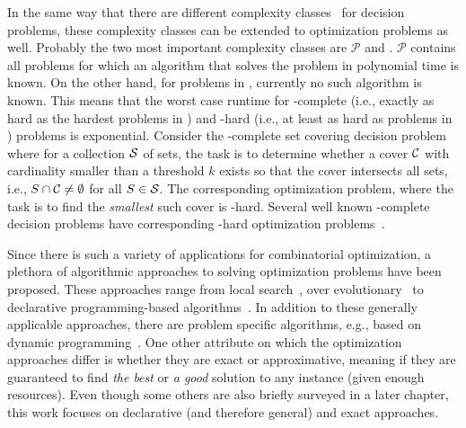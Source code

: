 In the same way that there are different complexity classes~\autocite{AroraBarak2009-complexity} for decision problems, these complexity classes can be extended to optimization problems as well.
Probably the two most important complexity classes are $\mathcal{P}$ and \NP.
$\mathcal{P}$ contains all problems for which an algorithm that solves the problem in polynomial time is known.
On the other hand, for problems in \NP, currently no such algorithm is known.
This means that the worst case runtime for \NP-complete (i.e., exactly as hard as the hardest problems in \NP) and \NP-hard (i.e., at least as hard as problems in \NP) problems is exponential.
Consider the \NP-complete set covering decision problem~\autocite{DBLP:conf/coco/Karp72} where for a collection $\mathcal{S}$ of sets, the task is to determine whether a cover $\mathcal{C}$ with cardinality smaller than a threshold $k$ exists so that the cover intersects all sets, i.e., $S \cap \mathcal{C} \neq \emptyset$ for all $S\in\mathcal{S}$.
The corresponding optimization problem, where the task is to find the \emph{smallest} such cover is \NP-hard.
Several well known \NP-complete decision problems have corresponding \NP-hard optimization problems~\autocite{KorteVygen2018-15}.

Since there is such a variety of applications for combinatorial optimization, a plethora of algorithmic approaches to solving optimization problems have been proposed.
These approaches range from local search~\autocite{DBLP:books/daglib/0017492}, over evolutionary~\autocites{DBLP:books/daglib/0087893,DBLP:journals/jgo/StornP97} to declarative programming-based algorithms~\autocite{handbook2-maxsat,ChenEtAl2010-intro,DBLP:reference/fai/2}.
In addition to these generally applicable approaches, there are problem specific algorithms, e.g., based on dynamic programming~\autocite{DBLP:conf/aaai/DemirovicS21}.
One other attribute on which the optimization approaches differ is whether they are exact or approximative, meaning if they are guaranteed to find \emph{the best} or \emph{a good} solution to any instance (given enough resources).
Even though some others are also briefly surveyed in a later chapter, this work focuses on declarative (and therefore general) and exact approaches.

